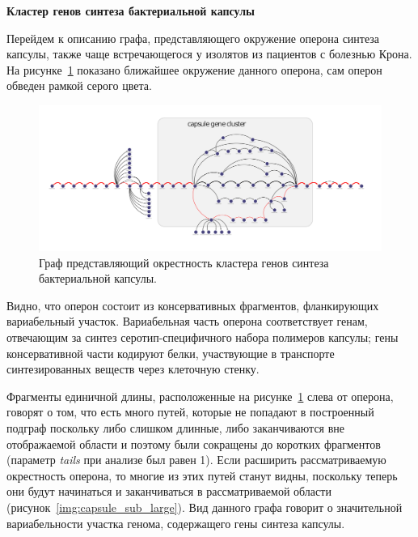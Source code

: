 \textbf{Кластер генов синтеза бактериальной капсулы}

Перейдем к описанию графа, представляющего окружение оперона синтеза капсулы, также чаще встречающегося у изолятов из пациентов с болезнью Крона. На рисунке~\ref{img:capsule_sub_small} показано ближайшее окружение данного оперона, сам оперон обведен рамкой серого цвета. 

\begin{figure}[!ht] 
  \center
    \includegraphics[width=\textwidth]{Dissertation/images/subgraphs/capsular_subgraph.png}
  \caption{Граф представляющий окрестность кластера генов синтеза бактериальной капсулы. }
  \label{img:capsule_sub_small} 
\end{figure}

Видно, что оперон состоит из консервативных фрагментов, фланкирующих вариабельный участок. Вариабельная часть оперона соответствует генам, отвечающим за синтез серотип-специфичного набора полимеров капсулы; гены консервативной части кодируют белки, участвующие в транспорте синтезированных веществ через клеточную стенку.

Фрагменты единичной длины, расположенные на рисунке~\ref{img:capsule_sub_small} слева от оперона, говорят о том, что есть много путей, которые не попадают в построенный подграф поскольку либо слишком длинные, либо заканчиваются вне отображаемой области и поэтому были сокращены до коротких фрагментов (параметр \textit{tails} при анализе был равен 1). Если расширить рассматриваемую окрестность оперона, то многие из этих путей станут видны, поскольку теперь они будут начинаться и заканчиваться в рассматриваемой области (рисунок~\ref{img:capsule_sub_large}). Вид данного графа говорит о значительной вариабельности участка генома, содержащего гены синтеза капсулы.


